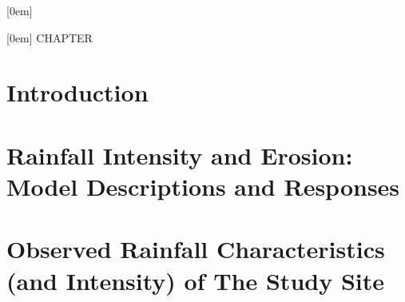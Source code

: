 \documentclass[oneside,12pt,a4paper]{oucethesis}
\begin{document}
[0em]
{\filright}{}{\scshape}
{\contentspage}

\maketitle



\frontmatter

\begin{singlespace}
\pagestyle{plain}



\tableofcontents
\listoffigures
\listoftables
\end{singlespace}

\addtolength{\footskip}{2ex}
\addtolength{\parskip}{1.5ex}%

[0em]
{\addvspace{4ex} \filright \bfseries}{CHAPTER \thecontentslabel\\}{}
{\titlerule*[1pc]{}\contentspage}



\mainmatter

\part{Introduction}
\label{sec:INTRODUCTION}




\part{Rainfall Intensity and Erosion: Model Descriptions and Responses}
\label{sec:RAINFALLINTENSITYCHANGESANDSOILEROSION}






\part{Observed Rainfall Characteristics (and Intensity) of The Study Site}
\label{sec:OBSERVEDPRECIPITATIONOFTHERESEARCHSITE}


\end{document}

